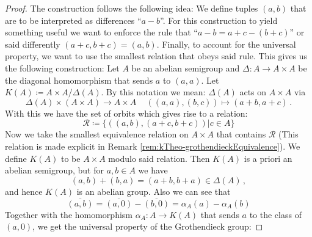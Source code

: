   \begin{proof}The construction follows the following idea: We define tuples $(a,b)$ that are to be interpreted as differences \enquote{$a-b$}. For this construction to yield something useful we want to enforce the rule that \enquote{$a-b=a+c-(b+c)$} or said differently $(a+c,b+c)=(a,b)$. Finally, to account for the universal property, we want to use the smallest relation that obeys said rule. This gives us the following construction: Let $A$ be an abelian semigroup and $\Delta:A\to A\times A$ be the diagonal homomorphism that sends $a$ to $(a,a)$. Let $K(A)\coloneq A\times A\big/ \Delta(A)$. By this notation we mean: $\Delta(A)$ acts on $A\times A$ via
	\begin{equation*}
		\Delta(A) \times (A\times A ) \to A\times A\,\quad ((a,a),(b,c))\mapsto (a+b,a+c)\,.
	\end{equation*} With this we have the set of orbits which gives rise to a relation:
	\begin{equation*}
		\mathcal{R}\coloneq \{((a,b),(a+c,b+c))| c\in A\}
	\end{equation*}Now we take the smallest equivalence relation on $A\times A$ that contains $\mathcal{R}$ (This relation is made explicit in Remark \ref{rem:kTheo-grothendieckEquivalence}). We define $K(A)$ to be $A\times A$ modulo said relation. Then $K(A)$ is a priori an abelian semigroup, but for $a,b\in A$ we have
\begin{equation*}
	(a,b)+(b,a)=(a+b,b+a)\in \Delta(A)\,,
\end{equation*} and hence $K(A)$ is an abelian group. Also we can see that 
\begin{equation*}
\overline{(a,b)}=\overline{(a,0)}-\overline{(b,0)}=\alpha_A(a)-\alpha_A(b)
\end{equation*} Together with the homomorphism $\alpha_A:A\to K(A)$ that sends $a$ to the class of $(a,0)$, we get the universal property of the Grothendieck group:


\end{proof}
